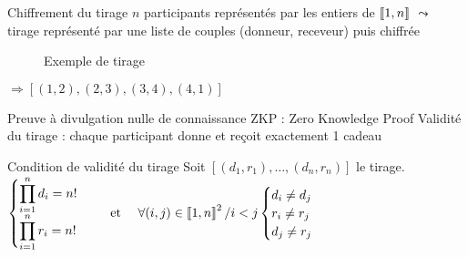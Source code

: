 \documentclass[10pt, compress]{beamer}
\begin{document}
  \begin{frame}{Chiffrement du tirage}
    $n$ participants représentés par les entiers de $\left\llbracket1, n\right\rrbracket$
    \bigbreak
    $\leadsto$ tirage représenté par une liste de \alert{couples (donneur, receveur)} puis chiffrée
    \bigbreak
    \begin{minipage}[h]{0.48\textwidth}
      \begin{figure}
        \caption{Exemple de tirage}
      \end{figure}
    \end{minipage}
    \begin{minipage}[h]{0.48\textwidth}
      $\Rightarrow [(1, 2), (2, 3), (3, 4), (4, 1)]$
    \end{minipage}
  \end{frame}

  \begin{frame}{Preuve à divulgation nulle de connaissance}
    \alert{ZKP} : Zero Knowledge Proof 
    \bigbreak
    Validité du tirage : chaque participant donne et reçoit exactement 1 cadeau
    \begin{alertblock}{Condition de validité du tirage}
      Soit $[(d_1, r_1), \ldots, (d_n, r_n)]$ le tirage.
        \(
        \begin{cases}
            \displaystyle\prod_{i=1}^nd_i=n ! \\
            \displaystyle\prod_{i=1}^nr_i=n !
        \end{cases}
        \quad\text{ et }\quad 
        \forall(i, j)\in\left\llbracket1, n\right\rrbracket^2 / i<j 
        \begin{cases}
          d_i\neq d_j \\
          r_i\neq r_j \\
          d_j\neq r_j
      \end{cases}\)
    \end{alertblock}
  \end{frame}
\end{document}
